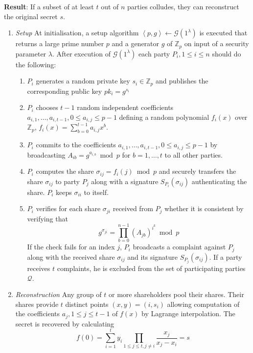 \begin{algorithm}
\begin{description}
 \item \textbf{Result}: If a subset of at least $t$ out of $n$ parties colludes, they can reconstruct the original secret $s$.
\end{description}
 \begin{enumerate}
  \item \textit{Setup} At initialisation, a setup algorithm $\left< p, g \right> \leftarrow \mathcal{G} \left( 1^{\lambda} \right)$ is executed that returns a large prime number $p$ and a generator $g$ of $\mathbb{Z}_p$ on input of a security parameter $\lambda$. After execution of $\mathcal{G} \left( 1^{\lambda} \right)$ each party $P_i, 1 \leq i \leq n$ should do the following:
   \begin{enumerate}
    \item $P_i$ generates a random private key $s_i \in \mathbb{Z}_p$ and publishes the corresponding public key $pk_i = g^{s_i}$
    \item $P_i$ chooses $t-1$ random independent coefficients $a_{i,1}, \ldots, a_{i,t-1}, 0 \leq a_{i,j} \leq p-1$ defining a random polynomial $f_i \left( x \right)$ over $\mathbb{Z}_p$, $f_i \left( x \right) = \sum^{t-1}_{b=0} a_{i,j} x^b$.
    \item $P_i$ commits to the coefficients $a_{i,1}, \ldots, a_{i,t-1}, 0 \leq a_{i,j} \leq p-1$ by broadcasting $A_{ib} = g^{a_{i,b}} \bmod p$ for $b = 1, \ldots, t$ to all other parties.
    \item $P_i$ computes the share $\sigma_{ij} = f_i \left( j \right) \bmod p$ and securely transfers the share $\sigma_{ij}$ to party $P_j$ along with a signature $S_{P_i} \left( \sigma_{ij} \right)$ authenticating the share. $P_i$ keeps $\sigma_{ii}$ to itself.
    \item $P_i$ verifies for each share $\sigma_{ji}$ received from $P_j$ whether it is consistent by verifying that
    \begin{equation*}
     g^{\sigma_{ji}} = \prod_{b=0}^{n-1} \left( A_{jb} \right)^{i^k} \bmod p
    \end{equation*}
    If the check fails for an index $j$, $P_i$ broadcasts a complaint against $P_j$ along with the received share $\sigma_{ij}$ and its signature $S_{P_j} \left( \sigma_{ij} \right)$. If a party receives $t$ complaints, he is excluded from the set of participating parties $\mathcal{Q}$.
   \end{enumerate}
   \item \textit{Reconstruction} Any group of $t$ or more shareholders pool their shares. Their shares provide $t$ distinct points $\left( x, y \right) = \left( i, s_i \right)$ allowing computation of the coefficients $a_j, 1 \leq j \leq t-1$ of $f \left( x \right)$ by Lagrange interpolation. The secret is recovered by calculating
 \begin{equation*}
  f \left( 0 \right) = \sum^t_{i=1}y_i \prod_{1 \leq j \leq t, j \neq i} \frac{x_j}{x_j-x_i} = s
 \end{equation*}
 \end{enumerate}
\end{algorithm}

